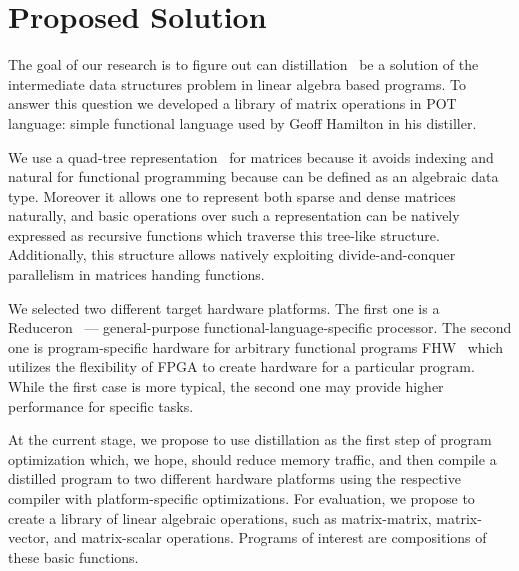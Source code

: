 \section{Proposed Solution}

The goal of our research is to figure out can distillation~\cite{hamilton2021700} be a solution of the intermediate data structures problem in linear algebra based programs.
To answer this question we developed a library of matrix operations in POT language: simple functional language used by Geoff Hamilton in his distiller.  

We use a quad-tree representation~\cite{qtree} for matrices because it avoids indexing and natural for functional programming because can be defined as an algebraic data type.
Moreover it allows one to represent both sparse and dense matrices naturally, and basic operations over such a representation can be natively expressed as recursive functions which traverse this tree-like structure.
Additionally, this structure allows natively exploiting divide-and-conquer parallelism in matrices handing functions.

We selected two different target hardware platforms.
The first one is a Reduceron~\cite{naylorRunciman2012} --- general-purpose functional-language-specific processor.
The second one is program-specific hardware for arbitrary functional programs FHW~\cite{Edwards2019FHWP} which utilizes the flexibility of FPGA to create hardware for a particular program.
While the first case is more typical, the second one may provide higher performance for specific tasks.

At the current stage, we propose to use distillation as the first step of program optimization which, we hope, should reduce memory traffic, and then compile a distilled program to two different hardware platforms using the respective compiler with platform-specific optimizations.
For evaluation, we propose to create a library of linear algebraic operations, such as matrix-matrix, matrix-vector, and matrix-scalar operations.
Programs of interest are compositions of these basic functions.